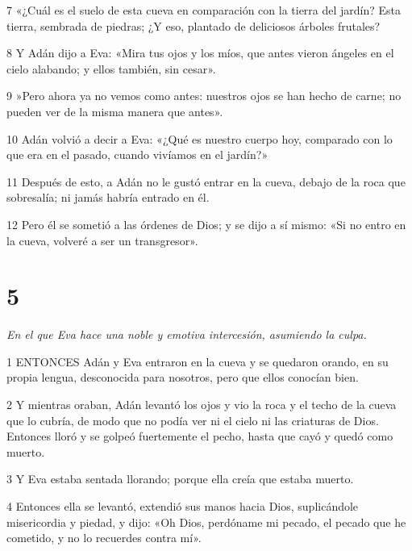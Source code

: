 \par 7 «¿Cuál es el suelo de esta cueva en comparación con la tierra del jardín? Esta tierra, sembrada de piedras; ¿Y eso, plantado de deliciosos árboles frutales?

\par 8 Y Adán dijo a Eva: «Mira tus ojos y los míos, que antes vieron ángeles en el cielo alabando; y ellos también, sin cesar».

\par 9 »Pero ahora ya no vemos como antes: nuestros ojos se han hecho de carne; no pueden ver de la misma manera que antes».

\par 10 Adán volvió a decir a Eva: «¿Qué es nuestro cuerpo hoy, comparado con lo que era en el pasado, cuando vivíamos en el jardín?»

\par 11 Después de esto, a Adán no le gustó entrar en la cueva, debajo de la roca que sobresalía; ni jamás habría entrado en él.

\par 12 Pero él se sometió a las órdenes de Dios; y se dijo a sí mismo: «Si no entro en la cueva, volveré a ser un transgresor».

\chapter{5}

\par \textit{En el que Eva hace una noble y emotiva intercesión, asumiendo la culpa.}

\par 1 ENTONCES Adán y Eva entraron en la cueva y se quedaron orando, en su propia lengua, desconocida para nosotros, pero que ellos conocían bien.

\par 2 Y mientras oraban, Adán levantó los ojos y vio la roca y el techo de la cueva que lo cubría, de modo que no podía ver ni el cielo ni las criaturas de Dios. Entonces lloró y se golpeó fuertemente el pecho, hasta que cayó y quedó como muerto.

\par 3 Y Eva estaba sentada llorando; porque ella creía que estaba muerto.

\par 4 Entonces ella se levantó, extendió sus manos hacia Dios, suplicándole misericordia y piedad, y dijo: «Oh Dios, perdóname mi pecado, el pecado que he cometido, y no lo recuerdes contra mí».

